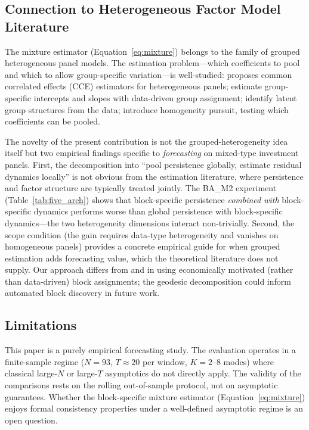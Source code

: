 \documentclass[11pt,a4paper]{article}
\begin{document}
\subsection{Connection to Heterogeneous Factor Model Literature}

The mixture estimator (Equation~\ref{eq:mixture}) belongs to the family of grouped heterogeneous panel models. The estimation problem---which coefficients to pool and which to allow group-specific variation---is well-studied: \citet{pesaran2006estimation} proposes common correlated effects (CCE) estimators for heterogeneous panels; \citet{bonhomme2015grouped} estimate group-specific intercepts and slopes with data-driven group assignment; \citet{su2016identifying} identify latent group structures from the data; \citet{ke2015homogeneity} introduce homogeneity pursuit, testing which coefficients can be pooled.

The novelty of the present contribution is not the grouped-heterogeneity idea itself but two empirical findings specific to \emph{forecasting} on mixed-type investment panels. First, the decomposition into ``pool persistence globally, estimate residual dynamics locally'' is not obvious from the estimation literature, where persistence and factor structure are typically treated jointly. The BA\_M2 experiment (Table~\ref{tab:five_arch}) shows that block-specific persistence \emph{combined with} block-specific dynamics performs worse than global persistence with block-specific dynamics---the two heterogeneity dimensions interact non-trivially. Second, the scope condition (the gain requires data-type heterogeneity and vanishes on homogeneous panels) provides a concrete empirical guide for when grouped estimation adds forecasting value, which the theoretical literature does not supply. Our approach differs from \citet{bonhomme2015grouped} and \citet{su2016identifying} in using economically motivated (rather than data-driven) block assignments; the geodesic decomposition could inform automated block discovery in future work.

\subsection{Limitations}

This paper is a purely empirical forecasting study. The evaluation operates in a finite-sample regime ($N = 93$, $T \approx 20$ per window, $K = 2$--$8$ modes) where classical large-$N$ or large-$T$ asymptotics do not directly apply. The validity of the comparisons rests on the rolling out-of-sample protocol, not on asymptotic guarantees. Whether the block-specific mixture estimator (Equation~\ref{eq:mixture}) enjoys formal consistency properties under a well-defined asymptotic regime is an open question.
\end{document}

